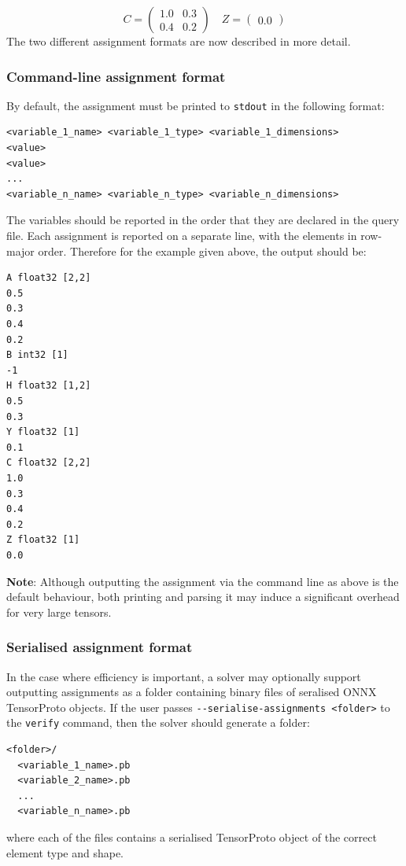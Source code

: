 \begin{equation*}
C = \begin{pmatrix}
1.0 & 0.3 \\
0.4 & 0.2
\end{pmatrix}
\quad
Z = \begin{pmatrix}
0.0
\end{pmatrix}
\end{equation*}
The two different assignment formats are now described in more detail.

\subsubsection{Command-line assignment format}

By default, the assignment must be printed to \texttt{stdout} in the following format:
\begin{lstlisting}[style=bash]
<variable_1_name> <variable_1_type> <variable_1_dimensions>
<value>
<value>
...
<variable_n_name> <variable_n_type> <variable_n_dimensions>
\end{lstlisting}
The variables should be reported in the order that they are declared in the query file. Each assignment is reported on a separate line, with the elements in row-major order. 
Therefore for the example given above, the output should be:
\begin{lstlisting}[style=bash]
A float32 [2,2]
0.5
0.3
0.4
0.2
B int32 [1]
-1
H float32 [1,2]
0.5
0.3
Y float32 [1]
0.1
C float32 [2,2]
1.0
0.3
0.4
0.2
Z float32 [1]
0.0
\end{lstlisting}

\textbf{Note}: Although outputting the assignment via the command line as above is the default behaviour, both printing and parsing it may induce a significant overhead for very large tensors. 

\subsubsection{Serialised assignment format}
\label{sec:seralised-assignment-format}

In the case where efficiency is important, a solver may optionally support outputting assignments as a folder containing binary files of seralised ONNX TensorProto objects. If the user passes \texttt{-{}-serialise-assignments <folder>} to the \texttt{verify} command, then the solver should generate a folder:
\begin{lstlisting}[style=bash]
<folder>/
  <variable_1_name>.pb
  <variable_2_name>.pb
  ...
  <variable_n_name>.pb
\end{lstlisting}
where each of the files contains a serialised TensorProto object of the correct element type and shape.

